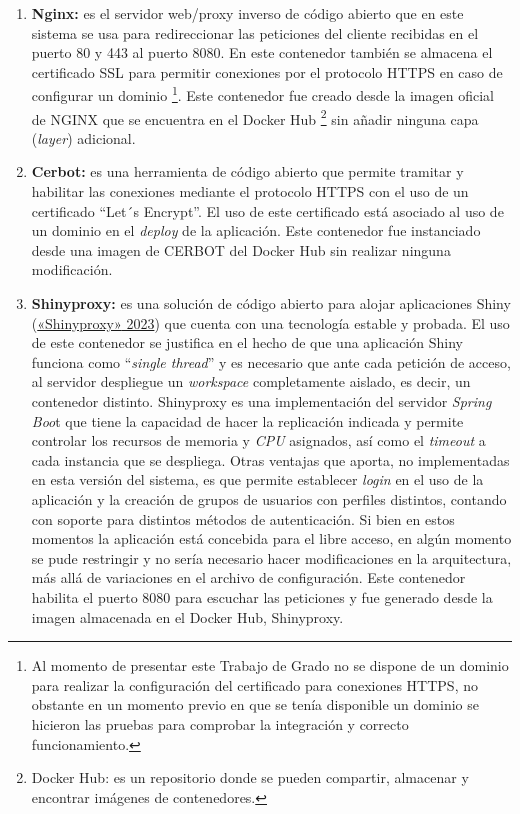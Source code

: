 \documentclass[
  12pt,
  openany]{book}
\begin{document}
\begin{enumerate}
\def\labelenumi{\arabic{enumi}.}
\item
  \textbf{Nginx:} es el servidor web/proxy inverso de código abierto que en este sistema se usa para redireccionar las peticiones del cliente recibidas en el puerto 80 y 443 al puerto 8080. En este contenedor también se almacena el certificado SSL para permitir conexiones por el protocolo HTTPS en caso de configurar un dominio \footnote{Al momento de presentar este Trabajo de Grado no se dispone de un dominio para realizar la configuración del certificado para conexiones HTTPS, no obstante en un momento previo en que se tenía disponible un dominio se hicieron las pruebas para comprobar la integración y correcto funcionamiento.}. Este contenedor fue creado desde la imagen oficial de NGINX que se encuentra en el Docker Hub \footnote{Docker Hub: es un repositorio donde se pueden compartir, almacenar y encontrar imágenes de contenedores.} sin añadir ninguna capa (\emph{layer}) adicional.
\item
  \textbf{Cerbot:} es una herramienta de código abierto que permite tramitar y habilitar las conexiones mediante el protocolo HTTPS con el uso de un certificado ``Let´s Encrypt''. El uso de este certificado está asociado al uso de un dominio en el \emph{deploy} de la aplicación. Este contenedor fue instanciado desde una imagen de CERBOT del Docker Hub sin realizar ninguna modificación.
\item
  \textbf{Shinyproxy:} es una solución de código abierto para alojar aplicaciones Shiny (\protect\hyperlink{ref-shinyproxy2023}{{«Shinyproxy»} 2023}) que cuenta con una tecnología estable y probada. El uso de este contenedor se justifica en el hecho de que una aplicación Shiny funciona como ``\emph{single thread}'' y es necesario que ante cada petición de acceso, al servidor despliegue un \emph{workspace} completamente aislado, es decir, un contenedor distinto. Shinyproxy es una implementación del servidor \emph{Spring Boo}t que tiene la capacidad de hacer la replicación indicada y permite controlar los recursos de memoria y \emph{CPU} asignados, así como el \emph{timeout} a cada instancia que se despliega. Otras ventajas que aporta, no implementadas en esta versión del sistema, es que permite establecer \emph{login} en el uso de la aplicación y la creación de grupos de usuarios con perfiles distintos, contando con soporte para distintos métodos de autenticación. Si bien en estos momentos la aplicación está concebida para el libre acceso, en algún momento se pude restringir y no sería necesario hacer modificaciones en la arquitectura, más allá de variaciones en el archivo de configuración. Este contenedor habilita el puerto 8080 para escuchar las peticiones y fue generado desde la imagen almacenada en el Docker Hub, Shinyproxy.

\end{enumerate}
\end{document}

